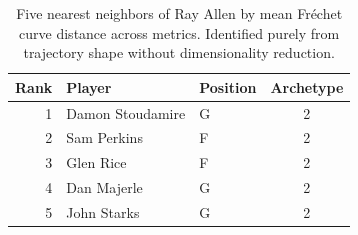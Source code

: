 \begin{table}[htbp]
  \centering\small
  \begin{tabular}{rllc}
    \toprule
    Rank & Player & Position & Archetype \\
    \midrule
    1 & Damon Stoudamire & G & 2 \\
    2 & Sam Perkins & F & 2 \\
    3 & Glen Rice & F & 2 \\
    4 & Dan Majerle & G & 2 \\
    5 & John Starks & G & 2 \\
    \bottomrule
  \end{tabular}
  \caption{Five nearest neighbors of Ray Allen by mean Fr\'{e}chet curve distance across metrics. Identified purely from trajectory shape without dimensionality reduction.}
  \label{tab:Ray_Allen_frechet_curve_neighbors}
\end{table}

